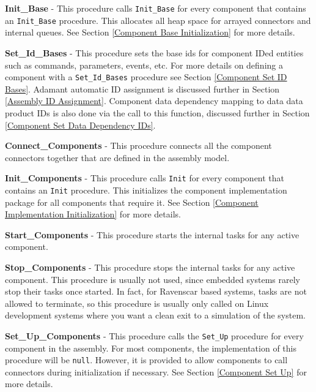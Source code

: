 \vspace{5mm} %
\begin{spacedenumerate}
  \item \textbf{Init\_Base} - This procedure calls \texttt{Init\_Base} for every component that contains an \texttt{Init\_Base} procedure. This allocates all heap space for arrayed connectors and internal queues. See Section \ref{Component Base Initialization} for more details.
  \item \textbf{Set\_Id\_Bases} - This procedure sets the base ids for component IDed entities such as commands, parameters, events, etc. For more details on defining a component with a \texttt{Set\_Id\_Bases} procedure see Section \ref{Component Set ID Bases}. Adamant automatic ID assignment is discussed further in Section \ref{Assembly ID Assignment}. Component data dependency mapping to data data product IDs is also done via the call to this function, discussed further in Section \ref{Component Set Data Dependency IDs}.
  \item \textbf{Connect\_Components} - This procedure connects all the component connectors together that are defined in the assembly model.
  \item \textbf{Init\_Components} - This procedure calls \texttt{Init} for every component that contains an \texttt{Init} procedure. This initializes the component implementation package for all components that require it. See Section \ref{Component Implementation Initialization} for more details.
  \item \textbf{Start\_Components} - This procedure starts the internal tasks for any active component.
  \item \textbf{Stop\_Components} - This procedure stops the internal tasks for any active component. This procedure is usually not used, since embedded systems rarely stop their tasks once started. In fact, for Ravenscar based systems, tasks are not allowed to terminate, so this procedure is usually only called on Linux development systems where you want a clean exit to a simulation of the system.
  \item \textbf{Set\_Up\_Components} - This procedure calls the \texttt{Set\_Up} procedure for every component in the assembly. For most components, the implementation of this procedure will be \texttt{null}. However, it is provided to allow components to call connectors during initialization if necessary. See Section \ref{Component Set Up} for more details.
\end{spacedenumerate}
\vspace{5mm} %

